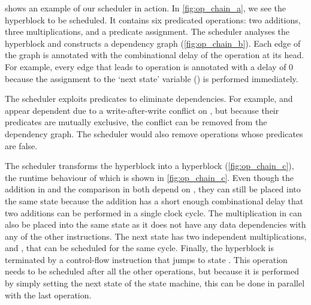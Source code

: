  shows an example of our scheduler in action. In
\cref{fig:op_chain_a}, we see the \rtlblock{} hyperblock to be scheduled. It
contains six predicated operations: two additions, three
multiplications, and a predicate assignment.
The scheduler analyses the hyperblock and constructs a dependency graph (\cref{fig:op_chain_b}). Each edge of the graph is annotated with the
combinational delay of the operation at its head. For example, every edge that leads to operation \sVII{}  is annotated with
a delay of 0 because the assignment to the `next state' variable () is performed
immediately.

The scheduler exploits predicates to eliminate dependencies. For example, \sIII{} and \sIV{} appear dependent due to a write-after-write conflict on , but
because their predicates are mutually exclusive, the conflict can be removed
from the dependency graph. The scheduler would also remove operations whose predicates are false.


The scheduler transforms the \rtlblock{} hyperblock into a \rtlpar{}
hyperblock (\cref{fig:op_chain_c}), the runtime behaviour of which is shown in
\cref{fig:op_chain_c}. Even though the addition in \sII{}
and the comparison in \sVI{} both depend on \sI{}, they can still be placed
into the same state because the addition has a short enough
combinational delay that two additions can be performed in a single clock cycle.
The multiplication in \sIII{} can also be placed into the
same state as it does not have any data dependencies with any of the other
instructions.  The next state has two independent
multiplications, \sIV{} and \sV{}, that can be scheduled for the same cycle. Finally, the hyperblock is terminated by a control-flow
instruction that jumps to state .  This operation needs
to be scheduled after all the other operations, but because it
is performed by simply setting the next state of the state machine, this can be done in parallel with the last operation.

